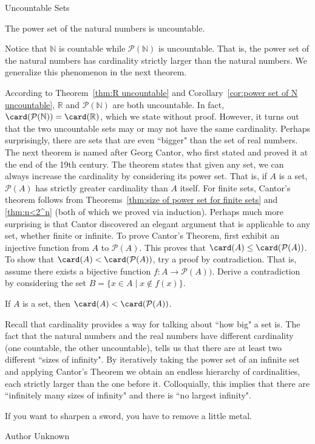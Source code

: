 \begin{section}{Uncountable Sets}
\begin{corollary}\label{cor:power set of N uncountable}
The power set of the natural numbers is uncountable.
\end{corollary}

Notice that $\mathbb{N}$ is countable while $\mathcal{P}(\mathbb{N})$ is uncountable.  That is, the power set of the natural numbers has cardinality strictly larger than the natural numbers. We generalize this phenomenon in the next theorem.

According to Theorem~\ref{thm:R uncountable} and Corollary~\ref{cor:power set of N uncountable}, $\mathbb{R}$ and $\mathcal{P}(\mathbb{N})$ are both uncountable. In fact, $\card(\mathcal{P}(\mathbb{N}))=\card(\mathbb{R})$, which we state without proof.  However, it turns out that the two uncountable sets may or may not have the same cardinality.  Perhaps surprisingly, there are sets that are even ``bigger" than the set of real numbers. The next theorem is named after Georg Cantor, who first stated and proved it at the end of the 19th century. The theorem states that given any set, we can always increase the cardinality by considering its power set. That is, if $A$ is a set, $\mathcal{P}(A)$ has strictly greater cardinality than $A$ itself. For finite sets, Cantor's theorem follows from Theorems~\ref{thm:size of power set for finite sets} and \ref{thm:n<2^n} (both of which we proved via induction). Perhaps much more surprising is that Cantor discovered an elegant argument that is applicable to any set, whether finite or infinite. To prove Cantor's Theorem, first exhibit an injective function from $A$ to $\mathcal{P}(A)$. This proves that $\card(A)\leq \card(\mathcal{P}(A))$. To show that $\card(A)< \card(\mathcal{P}(A))$, try a proof by contradiction. That is, assume there exists a bijective function $f:A\to\mathcal{P}(A))$. Derive a contradiction by considering the set $B=\{x\in A\mid x\notin f(x)\}$.

\begin{theorem}\label{thm:Cantors Theorem}
If $A$ is a set, then $\card(A)<\card(\mathcal{P}(A))$.
\end{theorem}

Recall that cardinality provides a way for talking about ``how big" a set is. The fact that the natural numbers and the real numbers have different cardinality (one countable, the other uncountable), tells us that there are at least two different ``sizes of infinity".  By iteratively taking the power set of an infinite set and applying Cantor's Theorem we obtain an endless hierarchy of cardinalities, each strictly larger than the one before it. Colloquially, this implies that there are ``infinitely many sizes of infinity" and there is ``no largest infinity".

\epigraph{If you want to sharpen a sword, you have to remove a little metal.}{Author Unknown}

\end{section}
